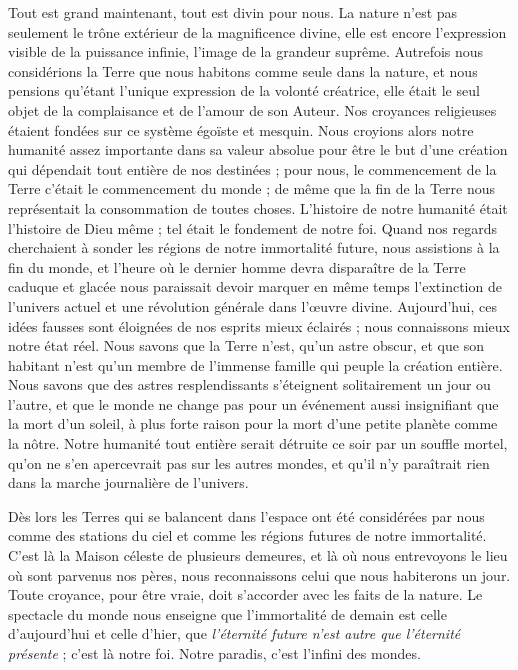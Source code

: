 \documentclass[a4paper, 11pt, oneside]{article}
\begin{document}
Tout est grand maintenant, tout est divin pour nous. La nature n'est pas seulement le trône extérieur de la magnificence divine, elle est encore l'expression visible de la puissance infinie, l'image de la grandeur suprême. Autrefois nous considérions la Terre que nous habitons comme seule dans la nature, et nous pensions qu'étant l'unique expression de la volonté créatrice, elle était le seul objet de la complaisance et de l'amour de son Auteur. Nos croyances religieuses étaient fondées sur ce système égoïste et mesquin. Nous croyions alors notre humanité assez importante dans sa valeur absolue pour être le but d'une création qui dépendait tout entière de nos destinées ; pour nous, le commencement de la Terre c'était le commencement du monde ; de même que la fin de la Terre nous représentait la consommation de toutes choses. L'histoire de notre humanité était l'histoire de Dieu même ; tel était le fondement de notre foi. Quand nos regards cherchaient à sonder les régions de notre immortalité future, nous assistions à la fin du monde, et l'heure où le dernier homme devra disparaître de la Terre caduque et glacée nous paraissait devoir marquer en même temps l'extinction de l'univers actuel et une révolution générale dans l'œuvre divine. Aujourd'hui, ces idées fausses sont éloignées de nos esprits mieux éclairés ; nous connaissons mieux notre état réel. Nous savons que la Terre n'est, qu'un astre obscur, et que son habitant n'est qu'un membre de l'immense famille qui peuple la création entière. Nous savons que des astres resplendissants s'éteignent solitairement un jour ou l'autre, et que le monde ne change pas pour un événement aussi insignifiant que la mort d'un soleil, à plus forte raison pour la mort d'une petite planète comme la nôtre. Notre humanité tout entière serait détruite ce soir par un souffle mortel, qu'on ne s'en apercevrait pas sur les autres mondes, et qu'il n'y paraîtrait rien dans la marche journalière de l'univers.

Dès lors les Terres qui se balancent dans l'espace ont été considérées par nous comme des stations du ciel et comme les régions futures de notre immortalité. C'est là la Maison céleste de plusieurs demeures, et là où nous entrevoyons le lieu où sont parvenus nos pères, nous reconnaissons celui que nous habiterons un jour. Toute croyance, pour être vraie, doit s'accorder avec les faits de la nature. Le spectacle du monde nous enseigne que l'immortalité de demain est celle d'aujourd'hui et celle d'hier, que \emph{l'éternité future n'est autre que l'éternité présente} ; c'est là notre foi. Notre paradis, c'est l'infini des mondes.
\end{document}
